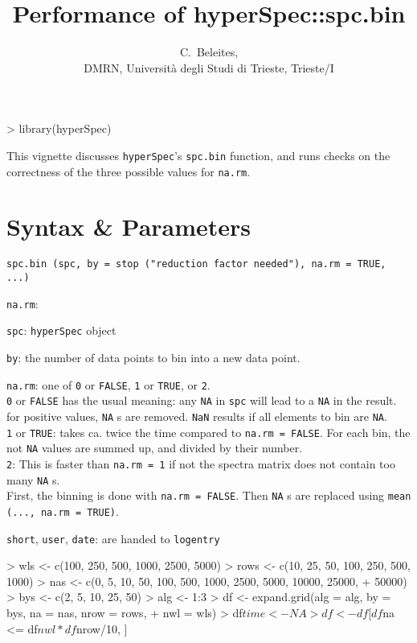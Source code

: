 \documentclass[a4paper, 10pt, smallheadings, DIV15]{scrartcl}
\author{C.~Beleites,\\DMRN, Università degli Studi di Trieste, Trieste/I}
\title{Performance of hyperSpec::spc.bin}
\newcommand{\code}[1]{\nohyphens{\texttt{#1}}\xspace}
\newcommand{\hy}{\code{hyperSpec}\xspace}
\renewenvironment{Schunk}{\vspace{\topsep}}{\vspace{\topsep}}
\begin{document}
 

\maketitle
\begin{Schunk}
\begin{Sinput}
> library(hyperSpec)
\end{Sinput}
\end{Schunk}

This vignette discusses \hy's \code{spc.bin} function, and runs checks on the correctness of the 
three possible values for \code{na.rm}.   

\section*{Syntax \& Parameters}  
\code{spc.bin (spc, by = stop ("reduction factor needed"), na.rm = TRUE, ...)}

\begin{labeling}{\code{na.rm}:~~~}
\item[\code{spc}:] \code{hyperSpec} object 
\item[\code{by}:] the number of data points to bin into a new data point.
\item[\code{na.rm}:] one of \code{0} or \code{FALSE}, \code{1} or \code{TRUE}, or \code{2}.\\ 
\code{0} or \code{FALSE} has the usual meaning: any \code{NA} in \code{spc} will lead to a \code{NA} in the result.\\
for positive values, \code{NA}s are removed. \code{NaN} results if all elements to bin are \code{NA}.\\ 
\code{1} or \code{TRUE}: takes ca. twice the time compared to \code{na.rm = FALSE}. 
For each bin, the not \code{NA} values are summed up, and divided by their number.\\
\code{2}: This is faster than \code{na.rm = 1} if not the spectra matrix does not contain too many \code{NA}s.\\ 
First, the binning is done with \code{na.rm = FALSE}. Then \code{NA}s are replaced using \code{mean (..., na.rm = TRUE)}.
\item[\code{short}, \code{user}, \code{date}:] are handed to \code{logentry}
\end{labeling}

\begin{Schunk}
\begin{Sinput}
> wls <- c(100, 250, 500, 1000, 2500, 5000)
> rows <- c(10, 25, 50, 100, 250, 500, 1000)
> nas <- c(0, 5, 10, 50, 100, 500, 1000, 2500, 5000, 10000, 25000, 
+     50000)
> bys <- c(2, 5, 10, 25, 50)
> alg <- 1:3
> df <- expand.grid(alg = alg, by = bys, na = nas, nrow = rows, 
+     nwl = wls)
> df$time <- NA
> df <- df[df$na <= df$nwl * df$nrow/10, ]
\end{Sinput}
\end{Schunk}
\end{document}
